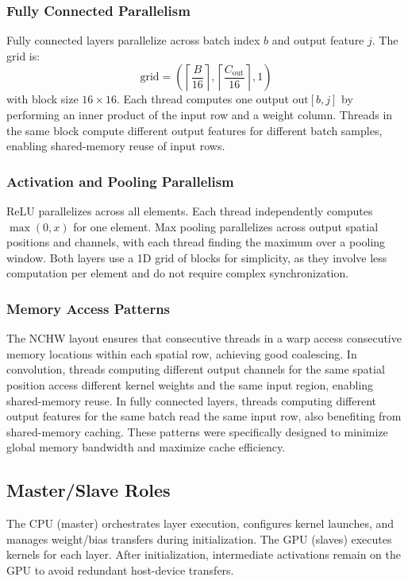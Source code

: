 \documentclass[11pt]{article}
\begin{document}
\subsubsection{Fully Connected Parallelism}
Fully connected layers parallelize across batch index $b$ and output feature $j$. The grid is:
\begin{equation}
\text{grid} = \left( \left\lceil \frac{B}{16} \right\rceil, \left\lceil \frac{C_{\text{out}}}{16} \right\rceil, 1 \right)
\end{equation}
with block size $16 \times 16$. Each thread computes one output $\mathrm{out}[b,j]$ by performing an inner product of the input row and a weight column. Threads in the same block compute different output features for different batch samples, enabling shared-memory reuse of input rows.

\subsubsection{Activation and Pooling Parallelism}
ReLU parallelizes across all elements. Each thread independently computes $\max(0, x)$ for one element. Max pooling parallelizes across output spatial positions and channels, with each thread finding the maximum over a pooling window. Both layers use a 1D grid of blocks for simplicity, as they involve less computation per element and do not require complex synchronization.

\subsubsection{Memory Access Patterns}
The NCHW layout ensures that consecutive threads in a warp access consecutive memory locations within each spatial row, achieving good coalescing. In convolution, threads computing different output channels for the same spatial position access different kernel weights and the same input region, enabling shared-memory reuse. In fully connected layers, threads computing different output features for the same batch read the same input row, also benefiting from shared-memory caching. These patterns were specifically designed to minimize global memory bandwidth and maximize cache efficiency.

\subsection{Master/Slave Roles}
The CPU (master) orchestrates layer execution, configures kernel launches, and manages weight/bias transfers during initialization. The GPU (slaves) executes kernels for each layer. After initialization, intermediate activations remain on the GPU to avoid redundant host-device transfers.
\end{document}
